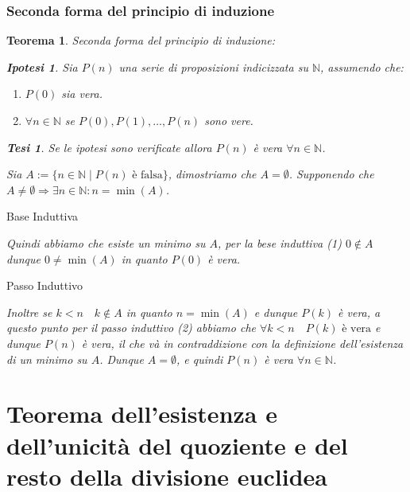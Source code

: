 \documentclass{article}
\makeatletter
\renewenvironment{proof}[1][\proofname]{\par
    \pushQED{\qed}%
    \normalfont \topsep6\p@\@plus6\p@\relax
    \trivlist
    \item\relax
    {\itshape
    #1\@addpunct{.}}\hspace\labelsep\ignorespaces
    }{%
    \popQED\endtrivlist\@endpefalse
}
\newtheorem{theorem}{Teorema}[part]
\newtheorem{ipothesis}[lemma]{Ipotesi}
\newtheorem{thesis}[lemma]{Tesi}
\makeatother
\begin{document}
\section{Seconda forma del principio di induzione}
\begin{theorem}
    Seconda forma del principio di induzione:
    \begin{ipothesis}
        Sia \(P(n)\) una serie di proposizioni indicizzata su \(\mathbb{N}\), assumendo che:
        \begin{enumerate}
            \item \(P(0)\) sia vera.
            \item \(\forall n\in\mathbb{N}\) se \(P(0),P(1),\ldots,P(n)\) sono vere.
        \end{enumerate}
    \end{ipothesis}
    \begin{thesis}
        Se le ipotesi sono verificate allora \(P(n)\) è vera \(\forall n\in\mathbb{N}\).
    \end{thesis}
    \begin{proof}
        Sia \(A:=\{n\in\mathbb{N}\mid P(n)\text{ è falsa}\}\), dimostriamo che \(A=\emptyset\). Supponendo che \(A\neq\emptyset\Rightarrow \exists n\in\mathbb{N}: n=\min (A)\).
        \subparagraph{Base Induttiva} Quindi abbiamo che esiste un minimo su \(A\), per la bese induttiva (1) \(0\notin A\) dunque \(0\neq\min (A)\) in quanto \(P(0)\) è vera.
        \subparagraph{Passo Induttivo} Inoltre se \(k<n\quad k\notin A\) in quanto \(n=\min(A)\) e dunque \(P(k)\) è vera, a questo punto per il passo induttivo (2) abbiamo che \(\forall k<n\quad P(k)\text{ è vera}\) e dunque \(P(n)\) è vera, il che và in contraddizione con la definizione dell'esistenza di un minimo su \(A\). Dunque \(A=\emptyset\), e quindi \(P(n)\) è vera \(\forall n\in\mathbb{N}\).
    \end{proof}
\end{theorem}
\pagebreak
\part{Teorema dell'esistenza e dell'unicità del quoziente e del resto della divisione euclidea}
\end{document}
